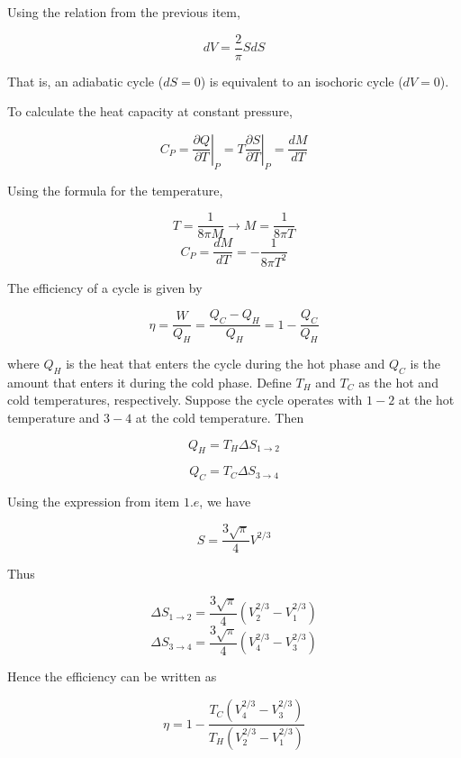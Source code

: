 \documentclass[11pt]{article}
\begin{document}
\begin{pproblem}
\begin{pssolution*}{}{}
        \begin{alternativas}
            \item Using the relation from the previous item,
            
            \[dV = \frac{2}{\pi}S dS\]

            That is, an adiabatic cycle (\(dS = 0\)) is equivalent to an isochoric cycle (\(dV = 0\)).

            \item To calculate the heat capacity at constant pressure,
            
            \[C_P = \left.\frac{\partial Q}{\partial T}\right\vert_P = T\left.\frac{\partial S}{\partial T}\right\vert_P = \frac{dM}{dT}\] 
            
            Using the formula for the temperature,

            \[T = \frac{1}{8\pi M} \rightarrow M = \frac{1}{8\pi T}\]
            \[\boxed{C_P = \frac{dM}{dT} = -\frac{1}{8\pi T^2}}\]

            \item The efficiency of a cycle is given by

            \[\eta = \frac{W}{Q_H} = \frac{Q_C-Q_H}{Q_H} = 1-\frac{Q_C}{Q_H}\]

            where \(Q_H\) is the heat that enters the cycle during the hot phase and \(Q_C\) is the amount that enters it during the cold phase. Define \(T_H\) and \(T_C\) as the hot and cold temperatures, respectively. Suppose the cycle operates with \(1-2\) at the hot temperature and \(3-4\) at the cold temperature. Then

            \[Q_H = T_H\Delta S_{1\rightarrow 2}\]

            \[Q_C = T_C\Delta S_{3\rightarrow 4}\]

            Using the expression from item \(1.e\), we have

            \[S = \frac{3\sqrt{\pi}}{4}V^{2/3}\]

            Thus

            \[\Delta S_{1\rightarrow 2} = \frac{3\sqrt\pi}{4}\left(V^{2/3}_2 - V^{2/3}_1\right)\]
            \[\Delta S_{3\rightarrow 4} = \frac{3\sqrt\pi}{4}\left(V^{2/3}_4 - V^{2/3}_3\right)\]

            Hence the efficiency can be written as

            \[\eta = 1 - \frac{T_C\left(V^{2/3}_4 - V^{2/3}_3\right)}{T_H \left(V^{2/3}_2 - V^{2/3}_1\right)}\]


\end{alternativas}
\end{pssolution*}
\end{pproblem}
\end{document}
